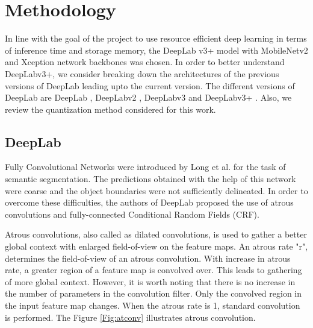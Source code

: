 \chapter{Methodology}

In line with the goal of the project to use resource efficient deep learning in terms of inference time and storage memory, the DeepLab v3+ model with MobileNetv2 \cite{DBLP:journals/corr/abs-1801-04381} and Xception \cite{DBLP:journals/corr/Chollet16a} network backbones was chosen. In order to better understand DeepLabv3+, we consider breaking down the architectures of the previous versions of DeepLab leading upto the current version. The different versions of DeepLab are DeepLab \cite{DBLP:journals/corr/ChenPKMY14}, DeepLabv2 \cite{DBLP:journals/corr/ChenPK0Y16}, DeepLabv3 \cite{DBLP:journals/corr/ChenPSA17} and DeepLabv3+ \cite{DBLP:journals/corr/abs-1802-02611}. Also, we review the quantization method considered for this work.

\section{DeepLab}

Fully Convolutional Networks \cite{7298965} were introduced by Long et al. for the task of semantic segmentation. The predictions obtained with the help of this network were coarse and the object boundaries were not sufficiently delineated. In order to overcome these difficulties, the authors of DeepLab proposed the use of atrous convolutions and fully-connected Conditional Random Fields (CRF).

Atrous convolutions, also called as dilated convolutions, is used to gather a better global context with enlarged field-of-view on the feature maps. An atrous rate "r", determines the field-of-view of an atrous convolution. With increase in atrous rate, a greater region of a feature map is convolved over. This leads to gathering of more global context. However, it is worth noting that there is no increase in the number of parameters in the convolution filter. Only the convolved region in the input feature map changes. When the atrous rate is 1, standard convolution is performed. The Figure \ref{Fig:atconv} illustrates atrous convolution. 

